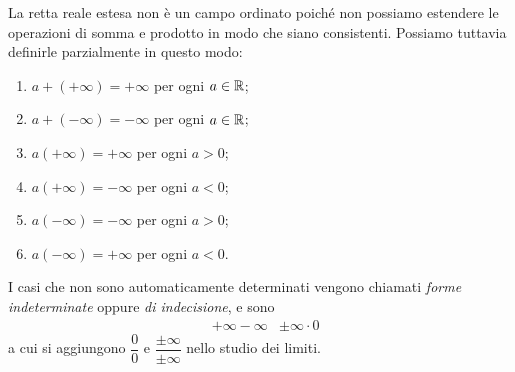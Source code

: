 La retta reale estesa non è un campo ordinato poiché non possiamo estendere le operazioni di somma e prodotto in modo che siano consistenti. Possiamo tuttavia definirle parzialmente in questo modo:
\begin{enumerate}
    \item $a + (+\infty) = +\infty$ per ogni $a \in \mathbb{R}$;
    \item $a + (-\infty) = -\infty$ per ogni $a \in \mathbb{R}$;
    \item $a(+\infty) = +\infty$ per ogni $a > 0$;
    \item $a(+\infty) = -\infty$ per ogni $a < 0$;
    \item $a(-\infty) = -\infty$ per ogni $a > 0$;
    \item $a(-\infty) = +\infty$ per ogni $a < 0$.
\end{enumerate}

I casi che non sono automaticamente determinati vengono chiamati \emph{forme indeterminate} oppure \emph{di indecisione}, e sono \begin{align*}
    &+\infty - \infty & \pm\infty \cdot 0
\end{align*} a cui si aggiungono $\dfrac{0}{0}$ e $\dfrac{\pm\infty}{\pm\infty}$ nello studio dei limiti.